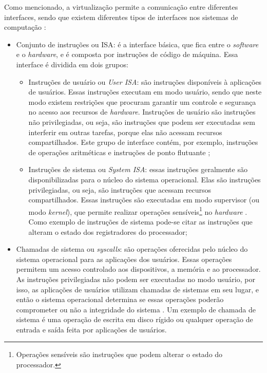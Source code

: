 Como mencionado, a virtualização permite a comunicação entre diferentes interfaces, sendo que existem diferentes tipos de interfaces
nos sistemas de computação \cite{maziero2013}:
\begin{itemize}
 \item Conjunto de instruções ou \ac{ISA}: é a interface básica, que fica entre o \textit{software} e o \textit{hardware}, e é composta por 
 instruções de código de máquina. Essa interface é dividida em dois grupos:
 \begin{itemize}
  \item Instruções de usuário ou \textit{User \ac{ISA}}: são instruções disponíveis à aplicações de usuários. Essas instruções executam em 
  modo usuário, sendo que neste modo existem restrições que procuram garantir um controle e segurança no acesso aos recursos de \textit{hardware}. 
  Instruções de usuário são instruções não privilegiadas, ou seja, são instruções que podem ser executadas sem interferir em outras tarefas, 
  porque elas não acessam recursos compartilhados. Este grupo de interface contém, por exemplo, instruções de operações aritméticas e instruções 
  de ponto flutuante \cite{buyya2013};
  \item Instruções de sistema ou \textit{System \ac{ISA}}: essas instruções geralmente são disponibilizadas para o núcleo do sistema operacional. 
  Elas são instruções privilegiadas, ou seja, são instruções que acessam recursos compartilhados. Essas instruções são executadas em modo 
  supervisor (ou modo \textit{kernel}), que permite realizar operações sensíveis\footnote[1]{Operações sensíveis são instruções que podem alterar o 
  estado do processador.} no \textit{hardware} \cite{buyya2013}. Como exemplo de instruções de sistema pode-se citar as instruções que alteram 
  o estado dos registradores do processador; %
 \end{itemize}
 \item Chamadas de sistema ou \textit{syscalls}: são operações oferecidas pelo núcleo do sistema operacional para as aplicações dos usuários.
 Essas operações permitem um acesso controlado aos dispositivos, a memória e ao processador. 
 As instruções privilegiadas não podem ser executadas no modo usuário, por isso, as aplicações de usuários utilizam chamadas de sistemas em seu 
 lugar, e então o sistema operacional determina se essas operações poderão comprometer ou não a integridade do sistema \cite{marinescu2013}.
 Um exemplo de chamada de sistema é uma operação de escrita em disco rígido ou qualquer operação de entrada e saída feita por aplicações de usuários.
\end{itemize}

